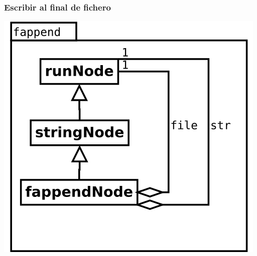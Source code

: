 \subsubsection {Escribir al final de fichero} 
\begin{center}
\includegraphics[scale=0.4]{fappend.png} \\
\end{center}
 
